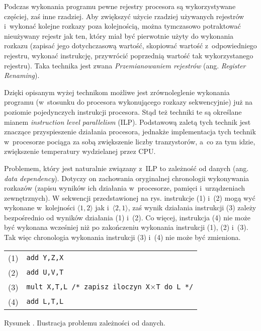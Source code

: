 \documentclass[12pt]{mwart}
\newcounter{figmain}
\newcommand{\myfigcounter}[1]{ \begin{center}\parbox[t]{11.5cm}{Rysunek \arabic{figmain}. #1.}\end{center} \addtocounter{figmain}{1} }
\begin{document}
\par
%
\indent
	Podczas wykonania programu pewne rejestry procesora są wykorzystywane częściej, zaś inne rzadziej. Aby zwiększyć użycie rzadziej
	używanych rejestrów i~wykonać kolejne rozkazy poza kolejnością, można tymczasowo potraktować nieużywany rejestr jak ten, który miał
	być pierwotnie użyty do wykonania rozkazu (zapisać jego dotychczasową wartość, skopiować wartość z~odpowiedniego rejestru, wykonać instrukcję,
	przywrócić poprzednią wartość tak wykorzystanego rejestru). Taka technika jest zwana 
	\emph{Przemianowaniem rejestrów} (ang. \emph{Register Renaming}).
\par
%
\indent
	Dzięki opisanym wyżej technikom możliwe jest zrównoleglenie wykonania programu (w~stosunku do procesora wykonującego rozkazy sekwencyjnie)
	już na poziomie pojedynczych instrukcji procesora. Stąd też techniki te są określane mianem \emph{instruction level parallelism} (ILP).
	Podstawową zaletą tych technik jest znaczące przyspieszenie działania procesora, jednakże implementacja tych technik w~procesorze pociąga za
	sobą zwiększenie liczby tranzystorów, a~co za tym idzie, zwiększenie temperatury wydzielanej przez CPU.
\par
%
 \setcounter{datadep}{\value{figmain}}
\indent
	Problemem, który jest naturalnie związany z~ILP to zależność od danych (ang. \emph{data dependency}).
	Dotyczy on zachowania oryginalnej chronologii wykonywania rozkazów (zapisu wyników
	ich działania w~procesorze, pamięci i~urządzeniach zewnętrznych). W sekwencji przedstawionej na rys.
	instrukcje (1) i~(2) mogą wyć wykonane w~kolejności $\langle 1,2 \rangle$ jak i~$\langle 2,1 \rangle$, zaś wynik działania instrukcji
	(3) zależy bezpośrednio od wyników działania (1) i~(2). Co więcej, instrukcja (4) nie może być wykonana wcześniej 
	niż po zakończeniu wykonania instrukcji (1), (2) i~(3). Tak więc chronologia wykonania instrukcji (3) i~(4) nie może być zmieniona.
	\begin{center}
	\begin{tabular}{l l}\\
		(1) & {\tt add Y,Z,X} \\
		(2) & {\tt add U,V,T} \\
		(3) & {\tt mult X,T,L /* zapisz iloczyn X}$\times${\tt T do L */} \\
		(4) & {\tt add L,T,L} \\
	\end{tabular}
	\myfigcounter{Ilustracja problemu zależności od danych}
	\end{center}
\end{document}
